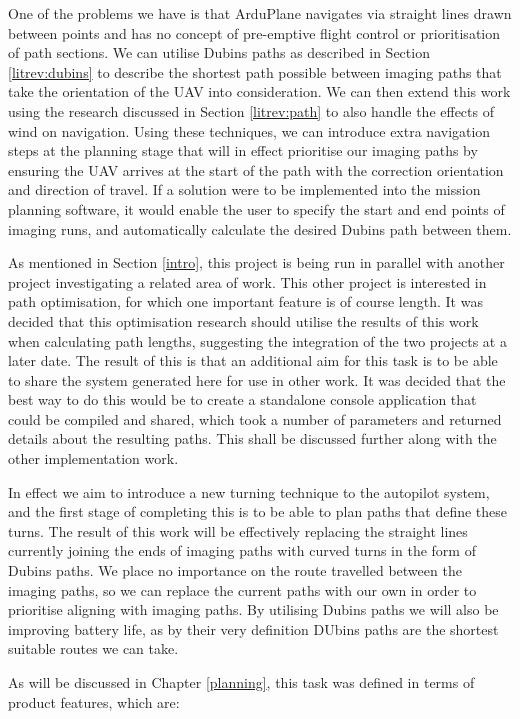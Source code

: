 One of the problems we have is that ArduPlane navigates via straight lines drawn between points and has no concept of pre-emptive flight control or prioritisation of path sections. We can utilise Dubins paths as described in Section \ref{litrev:dubins} to describe the shortest path possible between imaging paths that take the orientation of the UAV into consideration. We can then extend this work using the research discussed in Section \ref{litrev:path} to also handle the effects of wind on navigation. Using these techniques, we can introduce extra navigation steps at the planning stage that will in effect prioritise our imaging paths by ensuring the UAV arrives at the start of the path with the correction orientation and direction of travel. If a solution were to be implemented into the mission planning software, it would enable the user to specify the start and end points of imaging runs, and automatically calculate the desired Dubins path between them. 

As mentioned in Section \ref{intro}, this project is being run in parallel with another project investigating a related area of work. This other project is interested in path optimisation, for which one important feature is of course length. It was decided that this optimisation research should utilise the results of this work when calculating path lengths, suggesting the integration of the two projects at a later date. The result of this is that an additional aim for this task is to be able to share the system generated here for use in other work. It was decided that the best way to do this would be to create a standalone console application that could be compiled and shared, which took a number of parameters and returned details about the resulting paths. This shall be discussed further along with the other implementation work.

In effect we aim to introduce a new turning technique to the autopilot system, and the first stage of completing this is to be able to plan paths that define these turns. The result of this work will be effectively replacing the straight lines currently joining the ends of imaging paths with curved turns in the form of Dubins paths. We place no importance on the route travelled between the imaging paths, so we can replace the current paths with our own in order to prioritise aligning with imaging paths. By utilising Dubins paths we will also be improving battery life, as by their very definition DUbins paths are the shortest suitable routes we can take. 

As will be discussed in Chapter \ref{planning}, this task was defined in terms of product features, which are:

